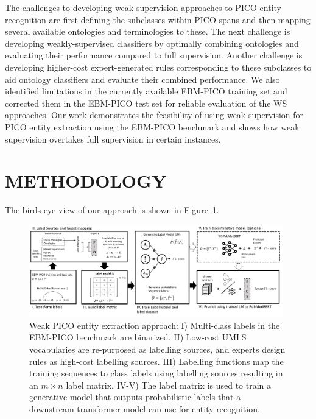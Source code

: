 \documentclass[10.7pt,]{article}
\begin{document}
The challenges to developing weak supervision approaches to PICO entity recognition are first defining the subclasses within PICO spans and then mapping several available ontologies and terminologies to these.
The next challenge is developing weakly-supervised classifiers by optimally combining ontologies and evaluating their performance compared to full supervision.
Another challenge is developing higher-cost expert-generated rules corresponding to these subclasses to aid ontology classifiers and evaluate their combined performance.
We also identified limitations in the currently available EBM-PICO training set and corrected them in the EBM-PICO test set for reliable evaluation of the WS approaches.
Our work demonstrates the feasibility of using weak supervision for PICO entity extraction using the EBM-PICO benchmark and shows how weak supervision overtakes full supervision in certain instances.
%
%
%
\section{METHODOLOGY}\label{methods}
%
The birds-eye view of our approach is shown in Figure~\ref{fig:approach}.
%
\begin{figure}[ht]
\centering
\includegraphics[width=0.98\textwidth]{figures/approach.pdf}
\caption{Weak PICO entity extraction approach: I) Multi-class labels in the EBM-PICO benchmark are binarized. II) Low-cost UMLS vocabularies are re-purposed as labelling sources, and experts design rules as high-cost labelling sources. III) Labelling functions map the training sequences to class labels using labelling sources resulting in an $m \times n$ label matrix. IV-V) The label matrix is used to train a generative model that outputs probabilistic labels that a downstream transformer model can use for entity recognition.}
\label{fig:approach}
\end{figure}
%
\end{document}
